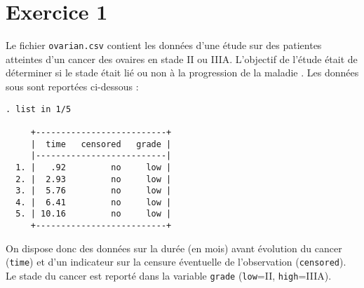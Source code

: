 \section*{Exercice 1}
Le fichier \texttt{ovarian.csv} contient les données d'une étude sur des
patientes atteintes d'un cancer des ovaires en stade II ou IIIA. L'objectif
de l'étude était de déterminer si le stade était lié ou non à la progression
de la maladie \cite[p.~389]{chow04}. Les données sous \Stata sont reportées
ci-dessous :
\begin{verbatim}
. list in 1/5

     +--------------------------+
     |  time   censored   grade |
     |--------------------------|
  1. |   .92         no     low |
  2. |  2.93         no     low |
  3. |  5.76         no     low |
  4. |  6.41         no     low |
  5. | 10.16         no     low |
     +--------------------------+
\end{verbatim}
On dispose donc des données sur la durée (en mois) avant évolution du cancer
(\texttt{time}) et d'un indicateur sur la censure éventuelle de
l'observation (\texttt{censored}). Le stade du cancer est reporté dans la
variable \texttt{grade} (\texttt{low}=II, \texttt{high}=IIIA).
